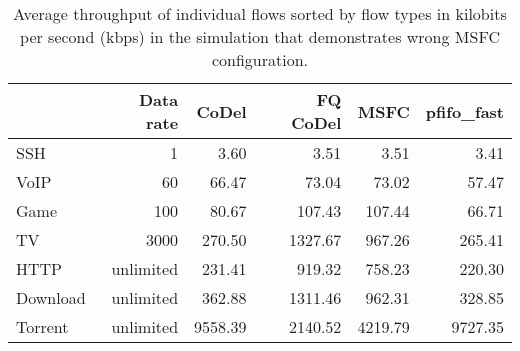 \begin{table}
	\centering
	\begin{tabular}{@{}l|rrrrr@{}}
		\toprule
		         & {Data rate} & {CoDel} & {FQ CoDel} &  {MSFC} & {pfifo\_fast} \\ \midrule
		SSH      &           1 &    3.60 &       3.51 &    3.51 &          3.41 \\
		VoIP     &          60 &   66.47 &      73.04 &   73.02 &         57.47 \\
		Game     &         100 &   80.67 &     107.43 &  107.44 &         66.71 \\
		TV       &        3000 &  270.50 &    1327.67 &  967.26 &        265.41 \\
		HTTP     &   unlimited &  231.41 &     919.32 &  758.23 &        220.30 \\
		Download &   unlimited &  362.88 &    1311.46 &  962.31 &        328.85 \\
		Torrent  &   unlimited & 9558.39 &    2140.52 & 4219.79 &       9727.35 \\ \bottomrule
	\end{tabular}
	\caption{Average throughput of individual flows sorted by flow types in kilobits per second (kbps) in the simulation that demonstrates wrong MSFC configuration.}
	\label{tab:throughput_B}
\end{table}









